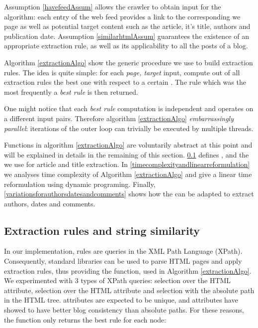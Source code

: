 Assumption \ref{havefeedAssum} allows the crawler to obtain input for the algorithm: each entry of the web feed provides a link to the corresponding we page as well as potential target content such as the article, it's title, authors and publication date. Assumption \ref{similarhtmlAssum} guarantees the existence of an appropriate extraction rule, as well as its applicability to all the posts of a blog.

Algorithm \ref{extractionAlgo} show the generic procedure we use to build extraction rules. The idea is quite simple: for each \code{(}\emph{page, target}\code{)} input, compute out of all extraction rules the best one with respect to a certain . The rule which was the most frequently a \emph{best rule} is then returned.

\extractionAlgo

One might notice that each \emph{best rule} computation is independent and operates on a different input pairs. Therefore algorithm \ref{extractionAlgo} \emph{embarrassingly parallel}: iterations of the outer loop can trivially be executed by multiple threads.

Functions in algorithm \ref{extractionAlgo} are voluntarily abstract at this point and will be explained in details in the remaining of this section. \ref{extractionrulesandstringsimilarity} defines ,  and the  we use for article and title extraction. In \ref{timecomplexityandlinearreformulation} we analyses time complexity of Algorithm \ref{extractionAlgo} and give a linear time reformulation using dynamic programing. Finally, \ref{variationsforauthorsdatesandcomments} shows how the  can be adapted to extract authors, dates and comments.


\subsection{Extraction rules and string similarity}
\label{extractionrulesandstringsimilarity}

In our implementation, rules are queries in the XML Path Language (XPath). Consequently, standard libraries can be used to parse HTML pages and apply extraction rules, thus providing the  function, used in Algorithm \ref{extractionAlgo}. We experimented with 3 types of XPath queries: selection over the HTML  attribute, selection over the HTML  attribute and selection with the absolute path in the HTML tree.  attributes are expected to be unique, and  attributes have showed to have better blog consistency than absolute paths. For these reasons, the  function only returns the best rule for each node:

